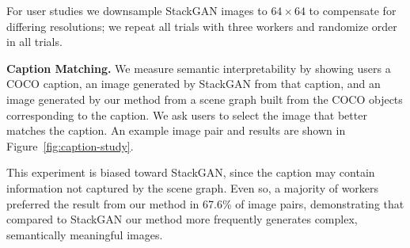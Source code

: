 \documentclass[10pt,twocolumn,letterpaper]{article}
\begin{document}
For user studies we downsample StackGAN images to $64\times64$ to compensate for differing resolutions; we repeat all trials with three workers and randomize order in all trials.

\textbf{Caption Matching.}
We measure semantic interpretability by showing users a COCO caption, an image generated by StackGAN from that caption, and an image generated by our method from a scene graph built from the COCO objects corresponding to the caption. We ask users to select the image that better matches the caption. An example image pair and results are shown in Figure~\ref{fig:caption-study}.

This experiment is biased toward StackGAN, since the caption may contain
information not captured by the scene graph. Even so, a majority of workers
preferred the result from our method in 67.6\% of image pairs,
demonstrating that compared to StackGAN our method more
frequently generates complex, semantically meaningful images.
\end{document}
